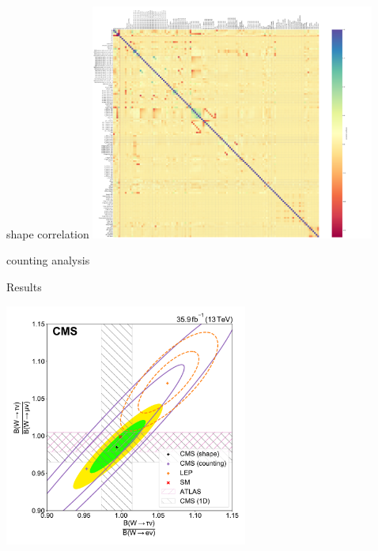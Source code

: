 \begin{frame}{shape correlation}
    \centering
    \includegraphics[width=0.7\textwidth]{chapters/Analysis/sectionSystematics/figures/correlation_matrix_full.pdf}
\end{frame}



\begin{frame}{}
\centering
counting analysis
    \begin{table}[]
        \setlength{\tabcolsep}{2em}
        \renewcommand{\arraystretch}{1}
        \resizebox{0.99\textwidth}{!}{}
    \end{table}
\end{frame}


\begin{frame}{Results}
    \begin{center}
        \includegraphics[width=0.6\textwidth]{chapters/Analysis/sectionResult/figures/result_contours_2d_ratio.pdf}
    \end{center}
\end{frame}